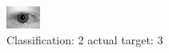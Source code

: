 \begin{figure}[h!]
\begin{center}
\includegraphics[width=0.60\columnwidth]{figures/ID665_class_2_target_3.png}
\end{center}
\caption{ Classification: 2 actual target: 3}
\label{fig:ID665_class_2_target_3}
\end{figure}
